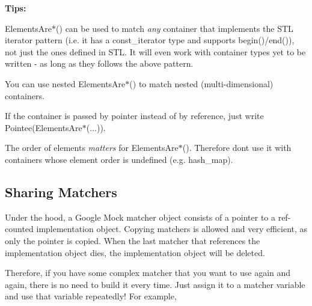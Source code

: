 \begin{DoxyCode}{0}
\end{DoxyCode}


{\bfseries Tips\+:}


\begin{DoxyItemize}
\item {\ttfamily Elements\+Are$\ast$()} can be used to match {\itshape any} container that implements the S\+TL iterator pattern (i.\+e. it has a {\ttfamily const\+\_\+iterator} type and supports {\ttfamily begin()/end()}), not just the ones defined in S\+TL. It will even work with container types yet to be written -\/ as long as they follows the above pattern.
\item You can use nested {\ttfamily Elements\+Are$\ast$()} to match nested (multi-\/dimensional) containers.
\item If the container is passed by pointer instead of by reference, just write {\ttfamily Pointee(\+Elements\+Are$\ast$(...))}.
\item The order of elements {\itshape matters} for {\ttfamily Elements\+Are$\ast$()}. Therefore don\textquotesingle{}t use it with containers whose element order is undefined (e.\+g. {\ttfamily hash\+\_\+map}).
\end{DoxyItemize}

\subsection*{Sharing Matchers}

Under the hood, a Google Mock matcher object consists of a pointer to a ref-\/counted implementation object. Copying matchers is allowed and very efficient, as only the pointer is copied. When the last matcher that references the implementation object dies, the implementation object will be deleted.

Therefore, if you have some complex matcher that you want to use again and again, there is no need to build it every time. Just assign it to a matcher variable and use that variable repeatedly! For example,


\begin{DoxyCode}{0}
\end{DoxyCode}


